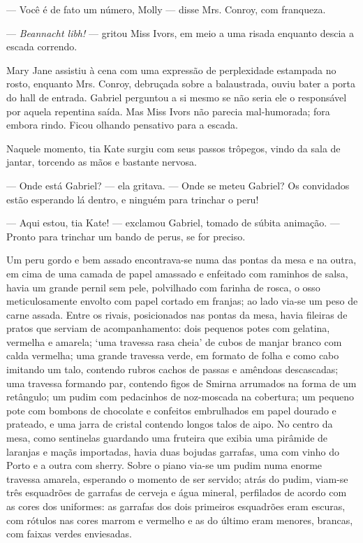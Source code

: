 --- Você é de fato um número, Molly --- disse Mrs. Conroy, com
franqueza.

--- \textit{Beannacht libh!} --- gritou Miss Ivors, em meio a uma risada
enquanto descia a escada correndo.

Mary Jane assistiu à cena com uma expressão de perplexidade estampada
no rosto, enquanto Mrs. Conroy, debruçada sobre a balaustrada, ouviu
bater a porta do hall de entrada. Gabriel perguntou a si mesmo se
não seria ele o responsável por aquela repentina saída. Mas Miss Ivors
não parecia mal-humorada; fora embora rindo. Ficou olhando pensativo
para a escada.

Naquele momento, tia Kate surgiu com seus passos trôpegos, vindo da
sala de jantar, torcendo as mãos e bastante nervosa.

--- Onde está Gabriel? --- ela gritava. --- Onde se meteu Gabriel? Os
convidados estão esperando lá dentro, e ninguém para trinchar o
peru!

--- Aqui estou, tia Kate! --- exclamou Gabriel, tomado de súbita
animação. --- Pronto para trinchar um bando de perus, se for preciso.

Um peru gordo e bem assado encontrava-se numa das pontas da mesa e na
outra, em cima de uma camada de papel amassado e enfeitado com
raminhos de salsa, havia um grande pernil sem pele, polvilhado com
farinha de rosca, o osso meticulosamente envolto com papel cortado em
franjas; ao lado via-se um peso de carne assada. Entre os rivais,
posicionados nas pontas da mesa, havia fileiras de pratos que serviam
de acompanhamento: dois pequenos potes com gelatina, vermelha e
amarela; `uma travessa rasa cheia' de cubos de manjar branco com
calda vermelha; uma grande travessa verde, em formato de folha e como
cabo imitando um talo, contendo rubros cachos de passas e amêndoas
descascadas; uma travessa formando par, contendo figos de Smirna
arrumados na forma de um retângulo; um pudim com pedacinhos de noz-moscada
na cobertura; um pequeno pote com bombons de chocolate e confeitos
embrulhados em papel dourado e prateado, e uma jarra de cristal
contendo longos talos de aipo. No centro da mesa, como sentinelas
guardando uma fruteira que exibia uma pirâmide de laranjas e maçãs
importadas, havia duas bojudas garrafas, uma com vinho do Porto e a
outra com sherry. Sobre o piano via-se um pudim numa enorme travessa
amarela, esperando o momento de ser servido; atrás do pudim, viam-se
três esquadrões de garrafas de cerveja e água mineral, perfilados de
acordo com as cores dos uniformes: as garrafas dos dois primeiros
esquadrões eram escuras, com rótulos nas cores marrom e vermelho e
as do último eram menores, brancas, com faixas verdes enviesadas.

